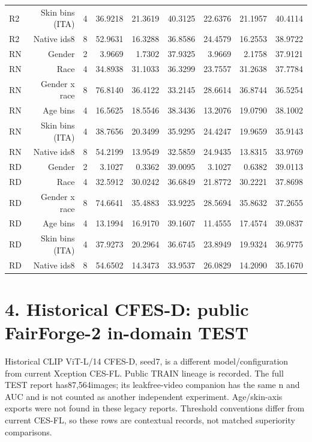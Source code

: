 \documentclass[10pt]{article}
\begin{document}
\begin{longtable}{@{}lrrrrrrrr@{}}
R2 & Skin bins (ITA) & 4 & 36.9218 & 21.3619 & 40.3125 & 22.6376 & 21.1957 & 40.4114 \\
R2 & Native ids8 & 8 & 52.9631 & 16.3288 & 36.8586 & 24.4579 & 16.2553 & 38.9722 \\
RN & Gender & 2 & 3.9669 & 1.7302 & 37.9325 & 3.9669 & 2.1758 & 37.9121 \\
RN & Race & 4 & 34.8938 & 31.1033 & 36.3299 & 23.7557 & 31.2638 & 37.7784 \\
RN & Gender x race & 8 & 76.8140 & 36.4122 & 33.2145 & 28.6614 & 36.8744 & 36.5254 \\
RN & Age bins & 4 & 16.5625 & 18.5546 & 38.3436 & 13.2076 & 19.0790 & 38.1002 \\
RN & Skin bins (ITA) & 4 & 38.7656 & 20.3499 & 35.9295 & 24.4247 & 19.9659 & 35.9143 \\
RN & Native ids8 & 8 & 54.2199 & 13.9549 & 32.5859 & 24.9435 & 13.8315 & 33.9769 \\
RD & Gender & 2 & 3.1027 & 0.3362 & 39.0095 & 3.1027 & 0.6382 & 39.0113 \\
RD & Race & 4 & 32.5912 & 30.0242 & 36.6849 & 21.8772 & 30.2221 & 37.8698 \\
RD & Gender x race & 8 & 74.6641 & 35.4883 & 33.9225 & 28.5694 & 35.8632 & 37.2655 \\
RD & Age bins & 4 & 13.1994 & 16.9170 & 39.1607 & 11.4555 & 17.4574 & 39.0837 \\
RD & Skin bins (ITA) & 4 & 37.9273 & 20.2964 & 36.6745 & 23.8949 & 19.9324 & 36.9775 \\
RD & Native ids8 & 8 & 54.6502 & 14.3473 & 33.9537 & 26.0829 & 14.2090 & 35.1670 \\
\end{longtable}

\section*{4. Historical CFES-D: public FairForge-2 in-domain TEST}
Historical CLIP ViT-L/14 CFES-D, seed7, is a different model/configuration from current Xception CES-FL. Public TRAIN lineage is recorded. The full TEST report has87,564images; its leakfree-video companion has the same n and AUC and is not counted as another independent experiment. Age/skin-axis exports were not found in these legacy reports. Threshold conventions differ from current CES-FL, so these rows are contextual records, not matched superiority comparisons.
\end{document}
